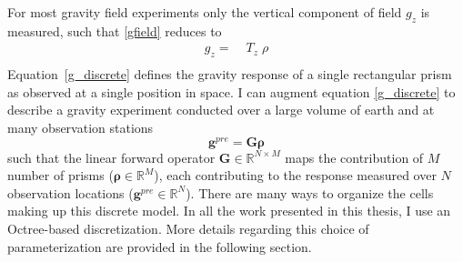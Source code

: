 For most gravity field experiments only the vertical component of field $g_z$ is measured, such that \eqref{gfield} reduces to
\begin{equation}
\begin{split}
g_z =\;& {T}_z \;{\rho} \\
\end{split}\label{g_discrete}
\end{equation}
Equation~\eqref{g_discrete} defines the gravity response of a single rectangular prism as observed at a single position in space. I can augment equation \eqref{g_discrete} to describe a gravity experiment conducted over a large volume of earth and at many observation stations
\begin{equation}\label{g_discrete_large}
	\mathbf{g}^{pre} = \mathbf{G} \boldsymbol{\rho}
\end{equation}
such that the linear forward operator $\mathbf{G}\in \mathbb{R}^{N\times M}$ maps the contribution of $M$ number of prisms ($\boldsymbol{\rho} \in \mathbb{R}^M$), each contributing to the response measured over $N$ observation locations ($\mathbf{g}^{pre} \in \mathbb{R}^{N}$).
There are many ways to organize the cells making up this discrete model.
In all the work presented in this thesis, I use an Octree-based discretization.
More details regarding this choice of parameterization are provided in the following section.

